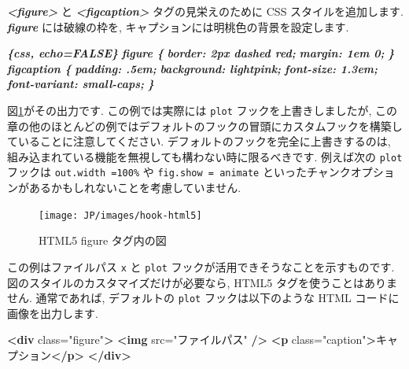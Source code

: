 \documentclass[
  11pt,
  lualatex,ja=standard,jafont=noto]{bxjsreport}
\newenvironment{Shaded}{\begin{snugshade}}{\end{snugshade}}
\newcommand{\InformationTok}[1]{\textcolor[rgb]{0.56,0.35,0.01}{\textbf{\textit{#1}}}}
\newcommand{\KeywordTok}[1]{\textcolor[rgb]{0.13,0.29,0.53}{\textbf{#1}}}
\newcommand{\NormalTok}[1]{#1}
\newcommand{\OtherTok}[1]{\textcolor[rgb]{0.56,0.35,0.01}{#1}}
\newcommand{\StringTok}[1]{\textcolor[rgb]{0.31,0.60,0.02}{#1}}
\begin{document}
\begin{Shaded}
\begin{Highlighting}[]
\InformationTok{\textasciigrave{}\textless{}figure\textgreater{}\textasciigrave{}}\NormalTok{ と }\InformationTok{\textasciigrave{}\textless{}figcaption\textgreater{}\textasciigrave{}}\NormalTok{ タグの見栄えのために CSS スタイルを追加します. }\InformationTok{\textasciigrave{}figure\textasciigrave{}}\NormalTok{ には破線の枠を, キャプションには明桃色の背景を設定します.}

\InformationTok{\textasciigrave{}\textasciigrave{}\textasciigrave{}\{css, echo=FALSE\}}
\InformationTok{figure \{}
\InformationTok{  border: 2px dashed red;}
\InformationTok{  margin: 1em 0;}
\InformationTok{\}}
\InformationTok{figcaption \{}
\InformationTok{  padding: .5em;}
\InformationTok{  background: lightpink;}
\InformationTok{  font{-}size: 1.3em;}
\InformationTok{  font{-}variant: small{-}caps;}
\InformationTok{\}}
\InformationTok{\textasciigrave{}\textasciigrave{}\textasciigrave{}}
\end{Highlighting}
\end{Shaded}

図\ref{fig:hook-html5}がその出力です. この例では実際には \texttt{plot} フックを上書きしましたが, この章の他のほとんどの例ではデフォルトのフックの冒頭にカスタムフックを構築していることに注意してください. デフォルトのフックを完全に上書きするのは, 組み込まれている機能を無視しても構わない時に限るべきです. 例えば次の \texttt{plot} フックは \texttt{out.width =\textquotesingle{}100\%\textquotesingle{}} や \texttt{fig.show = \textquotesingle{}animate\textquotesingle{}} といったチャンクオプションがあるかもしれないことを考慮していません.

\begin{figure}

{\centering \texttt{[image: JP/images/hook-html5]} 

}

\caption{HTML5 figure タグ内の図}\label{fig:hook-html5}
\end{figure}

この例はファイルパス \texttt{x} と \texttt{plot} フックが活用できそうなことを示すものです. 図のスタイルのカスタマイズだけが必要なら, HTML5 タグを使うことはありません. 通常であれば, デフォルトの \texttt{plot} フックは以下のような HTML コードに画像を出力します.

\begin{Shaded}
\begin{Highlighting}[]
\KeywordTok{\textless{}div}\OtherTok{ class=}\StringTok{"figure"}\KeywordTok{\textgreater{}}
  \KeywordTok{\textless{}img}\OtherTok{ src=}\StringTok{"ファイルパス"} \KeywordTok{/\textgreater{}}
  \KeywordTok{\textless{}p}\OtherTok{ class=}\StringTok{"caption"}\KeywordTok{\textgreater{}}\NormalTok{キャプション}\KeywordTok{\textless{}/p\textgreater{}}
\KeywordTok{\textless{}/div\textgreater{}}
\end{Highlighting}
\end{Shaded}
\end{document}
